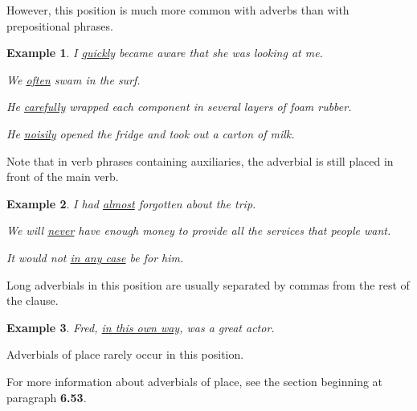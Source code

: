 \documentclass[oneside]{book}
\numberwithin{equation}{section}
\newtheorem{example}{Example}[section]
\begin{document}
However, this position is much more common with adverbs than with prepositional phrases.
\begin{example}
    I \underline{quickly} became aware that she was looking at me.
    
    We \underline{often} swam in the surf.
    
    He \underline{carefully} wrapped each component in several layers of foam rubber.
    
    He \underline{noisily} opened the fridge and took out a carton of milk.
\end{example}
Note that in verb phrases containing auxiliaries, the adverbial is still placed in front of the main verb.
\begin{example}
    I had \underline{almost} forgotten about the trip.
    
    We will \underline{never} have enough money to provide all the services that people want.
    
    It would not \underline{in any case} be for him.
\end{example}
Long adverbials in this position are usually separated by commas from the rest of the clause.
\begin{example}
    Fred, \underline{in this own way}, was a great actor.
\end{example}
Adverbials of place rarely occur in this position.

For more information about adverbials of place, see the section beginning at paragraph \textbf{6.53}.
\end{document}
